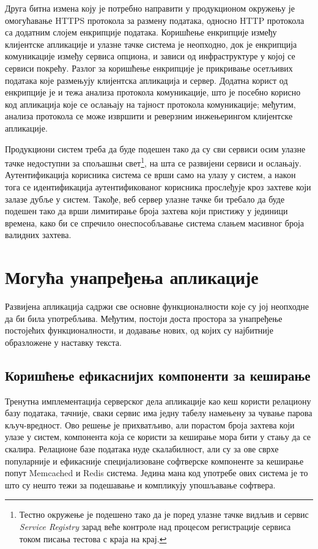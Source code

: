 \documentclass[12pt,oneside]{memoir}
\begin{document}
Друга битна измена коју је потребно направити у продукционом окружењу је омогућавање HTTPS протокола за размену података, односно HTTP протокола са додатним слојем енкрипције података. Коришћење енкрипције између клијентске апликације и улазне тачке система је неопходно, док је енкрипција комуникације између сервиса опциона, и зависи од инфраструктуре у којој се сервиси покрећу. Разлог за коришћење енкрипције је прикривање осетљивих података које размењују клијентска апликација и сервер. Додатна корист од енкрипције је и тежа анализа протокола комуникације, што је посебно корисно код апликација које се ослањају на тајност протокола комуникације; међутим, анализа протокола се може извршити и реверзним инжењерингом клијентске апликације.

Продукциони систем треба да буде подешен тако да су сви сервиси осим улазне тачке недоступни за спољашњи свет\footnote{Тестно окружење је подешено тако да је поред улазне тачке видљив и сервис \textit{Service Registry} зарад веће контроле над процесом регистрације сервиса током писања тестова с краја на крај.}, на шта се развијени сервиси и ослањају. Аутентификација корисника система се врши само на улазу у систем, а након тога се идентификација аутентификованог корисника прослеђује кроз захтеве који залазе дубље у систем. Такође, веб сервер улазне тачке би требало да буде подешен тако да врши лимитирање броја захтева који пристижу у јединици времена, како би се спречило онеспособљавање система слањем масивног броја валидних захтева.

\section{Могућа унапређења апликације}
Развијена апликација садржи све основне функционалности које су јој неопходне да би била употребљива. Међутим, постоји доста простора за унапређење постојећих функционалности, и додавање нових, од којих су најбитније образложене у наставку текста.

\subsection{Коришћење ефикаснијих компоненти за кеширање}
Тренутна имплементација серверског дела апликације као кеш користи релациону базу података, тачније, сваки сервис има једну табелу намењену за чување парова кључ-вредност. Ово решење је прихватљиво, али порастом броја захтева који улазе у систем, компонента која се користи за кеширање мора бити у стању да се скалира. Релационе базе података нуде скалабилност, али су за ове сврхе популарније и ефикасније специјализоване софтверске компоненте за кеширање попут Memcached \cite{memcached} и Redis \cite{redis} система. Једина мана код употребе ових система је то што су нешто тежи за подешавање и компликују упошљавање софтвера.
\end{document}
